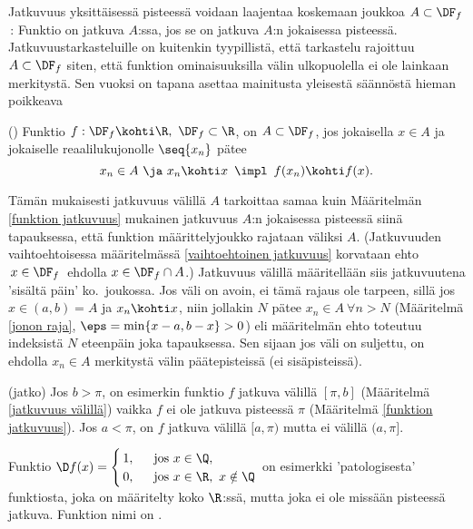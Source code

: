 Jatkuvuus yksittäisessä pisteessä voidaan laajentaa koskemaan joukkoa $A\subset\DF_f$\,:
Funktio on jatkuva $A$:ssa, jos se on jatkuva $A$:n jokaisessa pisteessä. 
Jatkuvuustarkasteluille on kuitenkin tyypillistä, että tarkastelu rajoittuu  
$A\subset\DF_f$ siten, että funktion ominaisuuksilla välin ulkopuolella ei ole lainkaan
merkitystä. Sen vuoksi on tapana asettaa mainitusta yleisestä säännöstä hieman poikkeava
\begin{Def} () \label{jatkuvuus välillä}
Funktio $f:\DF_f\kohti\R,\ \DF_f\subset\R$, on  $A\subset\DF_f$, jos
jokaisella $x \in A$ ja jokaiselle reaalilukujonolle $\seq{x_n}$ pätee
\[
x_n \in A\ \ja\ x_n \kohti x\,\ \impl\,\ f(x_n) \kohti f(x).
\]
\end{Def}
Tämän mukaisesti jatkuvuus välillä $A$ tarkoittaa samaa kuin Määritelmän
\ref{funktion jatkuvuus} mukainen jatkuvuus $A$:n jokaisessa pisteessä siinä tapauksessa, että
funktion määrittelyjoukko rajataan väliksi $A$. (Jatkuvuuden vaihtoehtoisessa määritelmässä
\ref{vaihtoehtoinen jatkuvuus} korvataan ehto $\,x\in\DF_f\,$ ehdolla $x\in\DF_f \cap A$.)
Jatkuvuus välillä määritellään siis jatkuvuutena 'sisältä päin' ko.\ joukossa. Jos väli on
avoin, ei tämä rajaus ole tarpeen, sillä jos $x\in(a,b)=A$ ja $x_n \kohti x$, niin jollakin $N$
pätee $x_n \in A\ \forall n>N$ (Määritelmä \ref{jonon raja}, $\eps=\min\{x-a,b-x\}>0$) eli
määritelmän ehto toteutuu indeksistä $N$ eteenpäin joka tapauksessa. Sen sijaan jos väli on
suljettu, on ehdolla $x_n \in A$ merkitystä välin päätepisteissä (ei sisäpisteissä).
\jatko\jatko \jatko \begin{Exa} (jatko) Jos $b>\pi$, on esimerkin funktio $f$ jatkuva välillä
$[\pi,b]$ (Määritelmä \ref{jatkuvuus välillä}) vaikka $f$ ei ole jatkuva pisteessä $\pi$
(Määritelmä \ref{funktion jatkuvuus}). Jos $a<\pi$, on $f$ jatkuva välillä $[a,\pi)$ mutta ei
välillä $(a,\pi]$. \loppu
\end{Exa} \seur\seur
\begin{Exa} \label{Dirichlet'n funktio} 
Funktio $\D
f(x)=\begin{cases}
     \,1, \ &\text{ jos } x\in\Q,  \\
     \,0, &\text{ jos } x\in\R, \ x\notin\Q
     \end{cases}$ \vspace{2mm}\newline
on esimerkki 'patologisesta' funktiosta, joka on määritelty koko $\R$:ssä, mutta joka ei ole 
missään pisteessä jatkuva. Funktion nimi on .  \loppu
\end{Exa}

